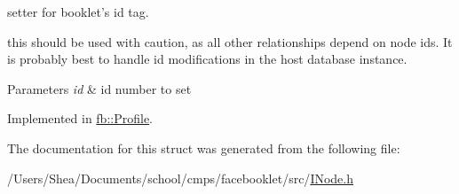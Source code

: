 setter for booklet's id tag. 

this should be used with caution, as all other relationships depend on node ids. It is probably best to handle id modifications in the host database instance.


\begin{DoxyParams}{Parameters}
{\em id} & id number to set \\
\hline
\end{DoxyParams}


Implemented in \hyperlink{classfb_1_1_profile_a8fe32885a03ac7c92675ede58a230f34}{fb\+::\+Profile}.



The documentation for this struct was generated from the following file\+:\begin{DoxyCompactItemize}
\item 
/\+Users/\+Shea/\+Documents/school/cmps/facebooklet/src/\hyperlink{_i_node_8h}{I\+Node.\+h}\end{DoxyCompactItemize}
